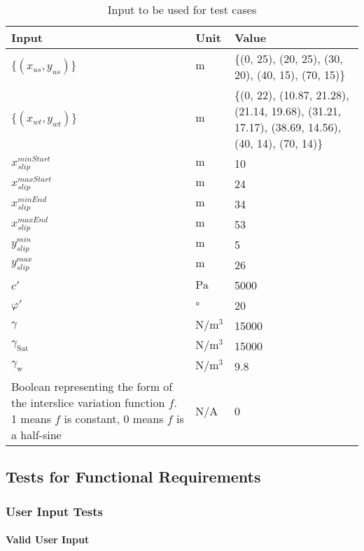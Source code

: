 \documentclass[12pt, titlepage]{article}
\begin{document}
\begin{table}[!h]
	\renewcommand{\arraystretch}{1.5}
	\begin{tabularx}{1.0\textwidth}{p{7cm} l X}
		\toprule \textbf{Input} &
		\textbf{Unit} & \textbf{Value}\\ \midrule
		$\{\left(x_{us},y_{us}\right)\}$ & $\text{m}$ & \{(0, 25), 
		(20, 25), (30, 20), (40, 15), (70, 15)\}\\
		$\{\left(x_{wt},y_{wt}\right)\}$ & $\text{m}$ & \{(0, 22), 
		(10.87, 21.28), (21.14, 19.68), (31.21, 17.17), (38.69, 14.56), (40, 
		14), (70, 14)\}\\
		${x_{slip}^{minStart}}$ & $\text{m}$ & 10\\
		${x_{slip}^{maxStart}}$ & $\text{m}$ & 24\\
		${x_{slip}^{minEnd}}$ & $\text{m}$ & 34\\
		${x_{slip}^{maxEnd}}$ & $\text{m}$ & 53\\
		${y_{slip}^{min}}$ & $\text{m}$ & 5\\
		${y_{slip}^{max}}$ & $\text{m}$ & 26\\
		$c'$ & $\si{\pascal}$ & 5000 \\
		$\varphi'$ & \si{\degree} & 20\\
		$\gamma$ & $\si{\newton\per\meter\cubed}$ & 15000 \\
		$\gamma_{\text{Sat}}$ & $\si{\newton\per\meter\cubed}$ & 15000 \\
		$\gamma_{\text{w}}$ & $\si{\newton\per\meter\cubed}$ & 9.8 \\
		Boolean representing the form of the interslice variation function $f$. 
		1 means $f$ is constant, 0 means $f$ is a half-sine & N/A & 0\\ 
		\bottomrule
	\end{tabularx}
	\caption{Input to be used for test cases}
	\label{ExValidInputs}
\end{table}
	
\subsection{Tests for Functional Requirements}

\subsubsection{User Input Tests}
		
\paragraph{Valid User Input}
\end{document}
